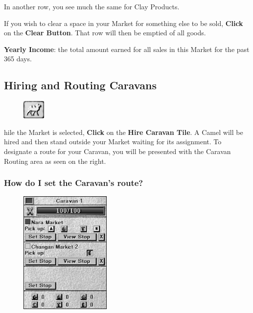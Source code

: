 In another row, you see much the same for Clay Products.

If you wish to clear a space in your Market for something else to be sold, \textbf{Click} on the \textbf{Clear Button}. That row will then be emptied of all goods.

\textbf{Yearly Income}: the total amount earned for all sales in this Market for the past 365 days.

\subsection{\textsf{Hiring and Routing Caravans}}

\begin{figure}
    \vspace{-20pt}
    \begin{center}
        \includegraphics[width=0.1\textwidth]{Tcamel} %
    \end{center}
    \vspace{-20pt}
\end{figure}


hile the Market is selected, \textbf{Click} on the \textbf{Hire Caravan Tile}. A Camel will be hired and then stand outside your Market waiting for its assignment. To designate a route for your Caravan, you will be presented with the Caravan Routing area as seen on the right.

\subsubsection{\textsf{How do I set the Caravan’s route?}}


\begin{figure}
    \vspace{-20pt}
    \begin{center}
        \includegraphics[width=0.4\textwidth]{Icamelinfo} %
    \end{center}
    \vspace{-20pt}
\end{figure}

